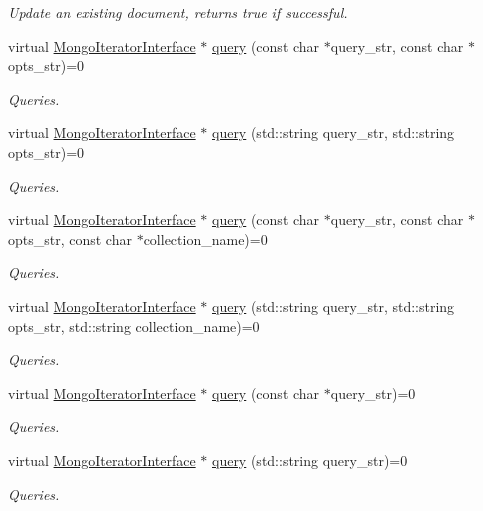 \begin{DoxyCompactItemize}
\begin{DoxyCompactList}\small\item\em Update an existing document, returns true if successful. \end{DoxyCompactList}\item 
virtual \hyperlink{classMongoIteratorInterface}{Mongo\+Iterator\+Interface} $\ast$ \hyperlink{classMongoInterface_a15ceb9bc80b43bc09afd0d5e32cea4f7}{query} (const char $\ast$query\+\_\+str, const char $\ast$opts\+\_\+str)=0
\begin{DoxyCompactList}\small\item\em Queries. \end{DoxyCompactList}\item 
virtual \hyperlink{classMongoIteratorInterface}{Mongo\+Iterator\+Interface} $\ast$ \hyperlink{classMongoInterface_a6f5d8758fe477e997df995028afe82a4}{query} (std\+::string query\+\_\+str, std\+::string opts\+\_\+str)=0
\begin{DoxyCompactList}\small\item\em Queries. \end{DoxyCompactList}\item 
virtual \hyperlink{classMongoIteratorInterface}{Mongo\+Iterator\+Interface} $\ast$ \hyperlink{classMongoInterface_ab4aa9b1a60d96ffcf787114fc2d436b0}{query} (const char $\ast$query\+\_\+str, const char $\ast$opts\+\_\+str, const char $\ast$collection\+\_\+name)=0
\begin{DoxyCompactList}\small\item\em Queries. \end{DoxyCompactList}\item 
virtual \hyperlink{classMongoIteratorInterface}{Mongo\+Iterator\+Interface} $\ast$ \hyperlink{classMongoInterface_a37fd750f45fc0a9b7360c3ad433c1747}{query} (std\+::string query\+\_\+str, std\+::string opts\+\_\+str, std\+::string collection\+\_\+name)=0
\begin{DoxyCompactList}\small\item\em Queries. \end{DoxyCompactList}\item 
virtual \hyperlink{classMongoIteratorInterface}{Mongo\+Iterator\+Interface} $\ast$ \hyperlink{classMongoInterface_a53f62c62e8a54abcb6ead11e544b51d0}{query} (const char $\ast$query\+\_\+str)=0
\begin{DoxyCompactList}\small\item\em Queries. \end{DoxyCompactList}\item 
virtual \hyperlink{classMongoIteratorInterface}{Mongo\+Iterator\+Interface} $\ast$ \hyperlink{classMongoInterface_afbfd334e99d9c1861ea9c4623b326e48}{query} (std\+::string query\+\_\+str)=0
\begin{DoxyCompactList}\small\item\em Queries. \end{DoxyCompactList}\end{DoxyCompactItemize}


